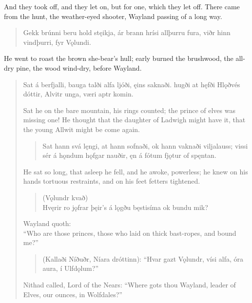 \bvb And they took off, and they let on, but for one, which they let off. There came from the hunt, the weather-eyed shooter, Wayland passing of a long way. \\

\begin{verse}
\bva Gekk brúnni \hld beru hold stęikja,
ár brann hrísi \hld allþurru fura,
viðr hinn vindþurri, \hld fyr Vǫlundi. \\%
\end{verse}

\bvb He went to roast the brown she-bear's hull; early burned the brushwood, the all-dry pine, the wood wind-dry, before Wayland.

\begin{verse}
\bva Sat á berfjalli, \hld bauga talði
alfa ljóði, \hld ęins saknaði.
hugði at hęfði \hld Hlǫðvés dóttir,
Alvitr unga, \hld væri aptr komin.
 
\bvb Sat he on the bare mountain, his rings counted; the prince of elves was missing one! He thought that the daughter of Ladwigh might have it, that the young Allwit might be come again.

\begin{verse}
\bva Sat hann svá lęngi, \hld at hann sofnaði,
ok hann vaknaði \hld viljalauss;
vissi sér á hǫndum \hld hǫfgar nauðir,
ęn á fótum \hld fjǫtur of spęntan. \\%
\end{verse}

\bvb He sat so long, that asleep he fell, and he awoke, powerless; he knew on his hands tortuous restraints, and on his feet fetters tightened.

\begin{verse}
(Vǫlundr kvað) \\
\bva Hvęrir ro jǫfrar \hld þęir’s á lǫgðu
bęstisíma \hld ok bundu mik? \\%
\end{verse}

\bvb Wayland quoth: \\
“Who are those princes, those who laid on thick bast-ropes, and bound me?”

\begin{verse}
\bva (Kallaði Níðuðr, \hld Níara dróttinn):
“Hvar gazt Vǫlundr, \hld vísi alfa,
óra aura, \hld í Ulfdǫlum?” \\%

\end{verse}

\bvb Nithad called, Lord of the Nears: “Where gots thou Wayland, leader of Elves, our ounces, in Wolfdales?”


\end{verse}
